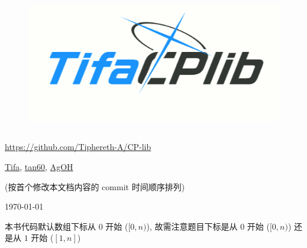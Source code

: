 \documentclass[10pt]{ICPCnotebook}
\begin{document}
\begin{titlepage}
    \vspace*{3cm}
    \begin{figure}[H]
        \centering
        \includegraphics[height=6cm]{img/cplib-logo-ba-style.png}
    \end{figure}

    \vspace*{6cm}
    \begin{center}
        \large \url{https://github.com/Tiphereth-A/CP-lib}
    \end{center}

    \vspace*{0.3cm}
    \begin{center}
        \href{https://github.com/Tiphereth-A}{Tifa}, \href{https://github.com/hongmaoya}{tan60}, \href{https://github.com/StableAgOH}{AgOH}
    \end{center}
    \begin{center}
        (按首个修改本文档内容的 commit 时间顺序排列)
    \end{center}

    \vspace*{0.2cm}
    \begin{center}
        \today
    \end{center}
\end{titlepage}

\pagestyle{plain}


本书代码默认数组下标从 \(0\) 开始 (\([0, n)\)), 故需注意题目下标是从 \(0\) 开始 (\([0, n)\)) 还是从 \(1\) 开始 (\([1, n]\))

\inputminted{cpp}{src/src/main.cpp}

\inputminted{cpp}{src/src/test.cpp}

\inputminted{yaml}{src/src/.clang-format}

\inputminted{bash}{src/src/run.sh}
\end{document}
